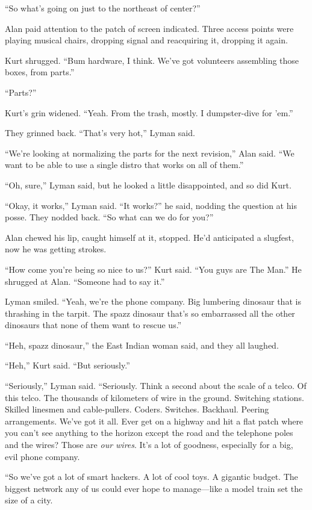 ``So what's going on just to the northeast of center?''

Alan paid attention to the patch of screen indicated.  Three access
points were playing musical chairs, dropping signal and reacquiring
it, dropping it again.

Kurt shrugged.  ``Bum hardware, I think.  We've got volunteers
assembling those boxes, from parts.''

``Parts?''

Kurt's grin widened.  ``Yeah.  From the trash, mostly.  I
dumpster-dive for 'em.''

They grinned back.  ``That's very hot,'' Lyman said.

``We're looking at normalizing the parts for the next revision,'' Alan
said.  ``We want to be able to use a single distro that works on all
of them.''

``Oh, sure,'' Lyman said, but he looked a little disappointed, and so
did Kurt.

``Okay, it works,'' Lyman said.  ``It works?'' he said, nodding the
question at his posse.  They nodded back.  ``So what can we do for
you?''

Alan chewed his lip, caught himself at it, stopped.  He'd anticipated
a slugfest, now he was getting strokes.

``How come you're being so nice to us?'' Kurt said.  ``You guys are
The Man.'' He shrugged at Alan.  ``Someone had to say it.''

Lyman smiled.  ``Yeah, we're the phone company.  Big lumbering
dinosaur that is thrashing in the tarpit.  The spazz dinosaur that's
so embarrassed all the other dinosaurs that none of them want to
rescue us.''

``Heh, spazz dinosaur,'' the East Indian woman said, and they all
laughed.

``Heh,'' Kurt said.  ``But seriously.''

``Seriously,'' Lyman said.  ``Seriously.  Think a second about the
scale of a telco.  Of this telco.  The thousands of kilometers of wire
in the ground.  Switching stations.  Skilled linesmen and
cable-pullers.  Coders.  Switches.  Backhaul.  Peering arrangements. 
We've got it all.  Ever get on a highway and hit a flat patch where
you can't see anything to the horizon except the road and the
telephone poles and the wires?  Those are \textit{our wires}.  It's a
lot of goodness, especially for a big, evil phone company.

``So we've got a lot of smart hackers.  A lot of cool toys.  A
gigantic budget.  The biggest network any of us could ever hope to
manage---like a model train set the size of a city.

